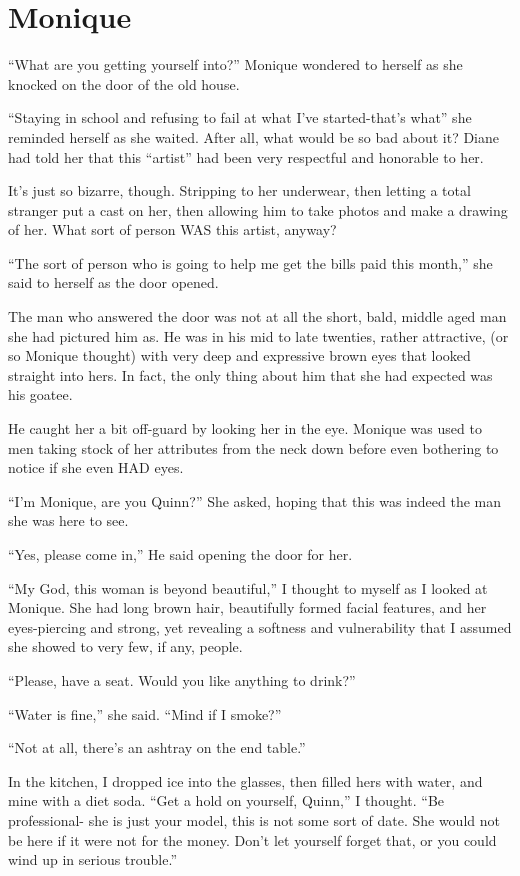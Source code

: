 \chapter{Monique}
    ``What are you getting yourself into?'' Monique wondered to herself as she knocked on the
door of the old house.

    ``Staying in school and refusing to fail at what I've started-that's what'' she reminded
herself as she waited. After all, what would be so bad about it? Diane had told her that this
``artist'' had been very respectful and honorable to her.

    It's just so bizarre, though. Stripping to her underwear, then letting a total stranger put
a cast on her, then allowing him to take photos and make a drawing of her. What sort of person
WAS this artist, anyway?

    ``The sort of person who is going to help me get the bills paid this month,'' she said to
herself as the door opened.

    The man who answered the door was not at all the short, bald, middle aged man she had
pictured him as. He was in his mid to late twenties, rather attractive, (or so Monique thought)
with very deep and expressive brown eyes that looked straight into hers. In fact, the only thing
about him that she had expected was his goatee.

    He caught her a bit off-guard by looking her in the eye. Monique was used to men taking
stock of her attributes from the neck down before even bothering to notice if she even HAD eyes.

    ``I'm Monique, are you Quinn?'' She asked, hoping that this was indeed the man she was here
to see.

    ``Yes, please come in,'' He said opening the door for her.

    ``My God, this woman is beyond beautiful,'' I thought to myself as I looked at Monique. She
had long brown hair, beautifully formed facial features, and her eyes-piercing and strong, yet
revealing a softness and vulnerability that I assumed she showed to very few, if any, people.

    ``Please, have a seat. Would you like anything to drink?''

    ``Water is fine,'' she said. ``Mind if I smoke?''

    ``Not at all, there's an ashtray on the end table.''

    In the kitchen, I dropped ice into the glasses, then filled hers with water, and mine with a
diet soda. ``Get a hold on yourself, Quinn,'' I thought. ``Be professional- she is just your
model, this is not some sort of date. She would not be here if it were not for the money. Don't
let yourself forget that, or you could wind up in serious trouble.''

